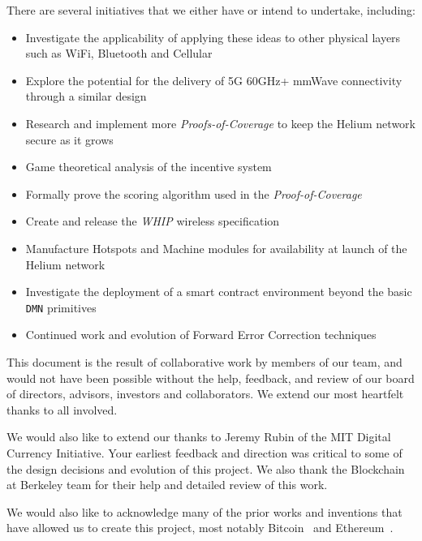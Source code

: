 \documentclass[10pt, nonatbib, nocopyrightspace, reprint]{sigplanconf}
\begin{document}
There are several initiatives that we either have or intend to undertake, including:

\begin{itemize}
    \item Investigate the applicability of applying these ideas to other physical layers such as WiFi, Bluetooth and Cellular
    \item Explore the potential for the delivery of 5G 60GHz+ mmWave connectivity through a similar design
    \item Research and implement more \emph{Proofs-of-Coverage} to keep the Helium network secure as it grows
    \item Game theoretical analysis of the incentive system
    \item Formally prove the scoring algorithm used in the \emph{Proof-of-Coverage}
    \item Create and release the \emph{WHIP} wireless specification
    \item Manufacture Hotspots and Machine modules for availability at launch of the Helium network
    \item Investigate the deployment of a smart contract environment beyond the basic \verb|DMN| primitives
    \item Continued work and evolution of Forward Error Correction techniques
\end{itemize}

\acks

This document is the result of collaborative work by members of our team, and would not have been possible without the help, feedback, and review of our board of directors, advisors, investors and collaborators. We extend our most heartfelt thanks to all involved.

We would also like to extend our thanks to Jeremy Rubin of the MIT Digital Currency Initiative. Your earliest feedback and direction was critical to some of the design decisions and evolution of this project. We also thank the Blockchain at Berkeley team for their help and detailed review of this work.

We would also like to acknowledge many of the prior works and inventions that have allowed us to create this project, most notably Bitcoin~\cite{bitcoin} and Ethereum~\cite{ethereum}.
\newpage
\end{document}
